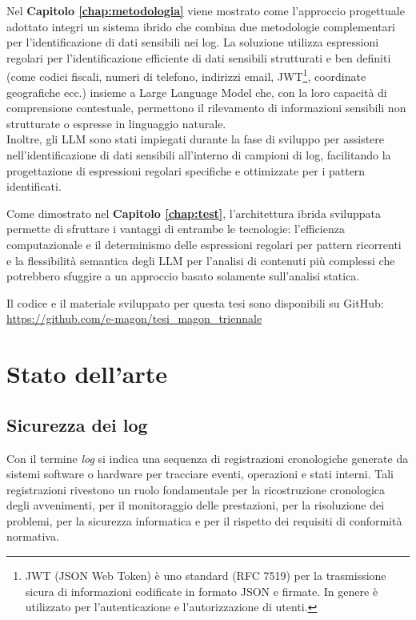 \documentclass[12pt,twoside]{report}
\begin{document}
Nel \textbf{Capitolo \ref{chap:metodologia}} viene mostrato come l'approccio progettuale adottato integri un sistema ibrido che combina due metodologie complementari per l'identificazione di dati sensibili nei log. La soluzione utilizza espressioni regolari per l'identificazione efficiente di dati sensibili strutturati e ben definiti (come codici fiscali, numeri di telefono, indirizzi email, JWT\footnote{JWT (JSON Web Token) è uno standard (RFC 7519) per la trasmissione sicura di informazioni codificate in formato JSON e firmate. In genere è utilizzato per l'autenticazione e l'autorizzazione di utenti.}, coordinate geografiche ecc.) insieme a Large Language Model che, con la loro capacità di comprensione contestuale, permettono il rilevamento di informazioni sensibili non strutturate o espresse in linguaggio naturale.\\
Inoltre, gli LLM sono stati impiegati durante la fase di sviluppo per assistere nell'identificazione di dati sensibili all'interno di campioni di log, facilitando la progettazione di espressioni regolari specifiche e ottimizzate per i pattern identificati.

Come dimostrato nel \textbf{Capitolo \ref{chap:test}}, l'architettura ibrida sviluppata permette di sfruttare i vantaggi di entrambe le tecnologie: l'efficienza computazionale e il determinismo delle espressioni regolari per pattern ricorrenti e la flessibilità semantica degli LLM per l'analisi di contenuti più complessi che potrebbero sfuggire a un approccio basato solamente sull'analisi statica.

Il codice e il materiale sviluppato per questa tesi sono disponibili su GitHub:\\
\url{https://github.com/e-magon/tesi_magon_triennale}


%
%

\cleardoublepage
\chapter{Stato dell'arte}
\label{chap:stato_arte}

\section{Sicurezza dei log}
\label{sec:sicurezza_log}

Con il termine \textit{log} si indica una sequenza di registrazioni cronologiche generate da sistemi software o hardware per tracciare eventi, operazioni e stati interni. Tali registrazioni rivestono un ruolo fondamentale per la ricostruzione cronologica degli avvenimenti, per il monitoraggio delle prestazioni, per la risoluzione dei problemi, per la sicurezza informatica e per il rispetto dei requisiti di conformità normativa.
\end{document}
